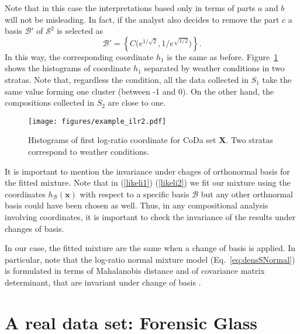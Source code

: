 \documentclass[12pt, a4paper]{article}
\begin{document}
Note that in this case the interpretations based only in terms of parts $a$ and $b$ will not be misleading. In fact, if the analyst also decides to remove the part $c$ a basis $\mathcal{B}'$ of $\mathcal{S}^2$ is selected as
\begin{equation}
\mathcal{B}' = \left\{ C\Big( e^{1/\sqrt{2}}, 1/e^{\sqrt{1/2}} \Big) \right\}.
\end{equation}
In this way, the corresponding coordinate $h_1$ is the same as before. Figure~\ref{example_ilr2} 
shows the histograms of coordinate $h_1$ separated by weather conditions in two stratas. Note that, regardless the condition, all the data collected in $S_1$ take the same value forming one cluster (between -1 and 0). On the other hand, the compositions collected in $S_2$ are close to one.

\begin{figure}[thbp]
\centering
\texttt{[image: figures/example\_ilr2.pdf]}
\caption{Histograms of first log-ratio coordinate for CoDa set $\mathbf{X}$. Two stratas correspond to weather conditions.}\label{example_ilr2}
\end{figure}
% 


It is important to mention the invariance under chages of orthonormal basis for the fitted mixture. Note that in (\ref{likeli1}) (\ref{likeli2}) we fit our mixture using the coordinates $h_\mathcal{B}(\textbf{x})$ with respect to a specific basis $\mathcal{B}$ but any other orthnormal basis could have been chosen as well. Thus, in any compositional analysis involving coordinates, it is important to check the invariance of the results under changes of basis.

In our case, the fitted mixture are the same when a change of basis is applied. In particular, note that the log-ratio normal mixture model  (Eq.~\ref{eq:densSNormal}) is formulated in terms of Mahalanobis distance and of covariance matrix determinant, that are invariant under change of basis  \citep{barcelo1999comment}.

\section{A real data set: Forensic Glass}
\label{example_section}
\end{document}
